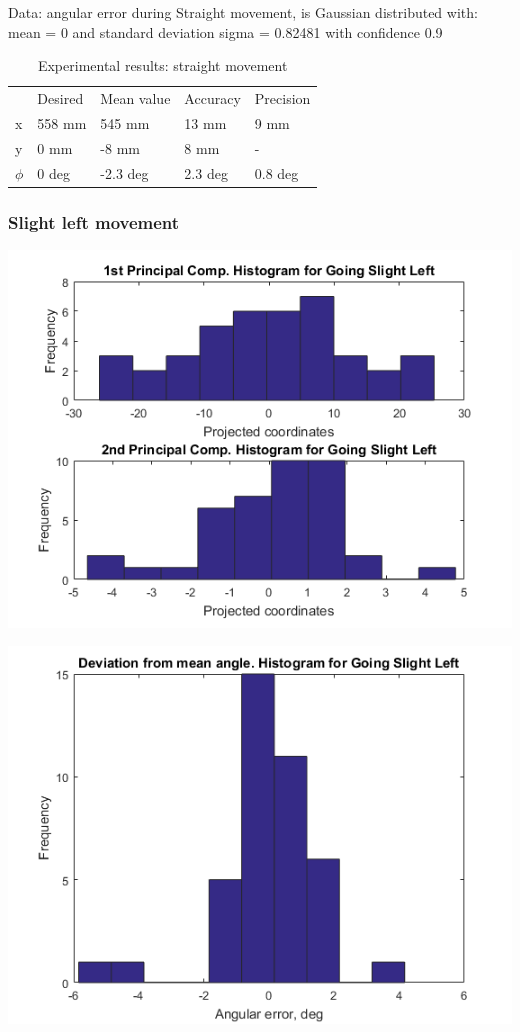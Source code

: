 \documentclass[a4paper, 12pt]{article}
\begin{document}
Data: angular error during   Straight movement, is Gaussian distributed with: mean = 0 and standard deviation sigma = 0.82481 with confidence 0.9%

\begin{table}[!h]
\centering
\caption{Experimental results: straight movement}
\begin{tabular}{lllll}
     & Desired & Mean value & Accuracy & Precision \\
x    &  558  mm     &    545  mm      &    13  mm    &     9  mm    \\
y    &  0  mm     &     -8  mm     &  8    mm    &    -       \\
$\phi$ &  0   deg    &     -2.3    deg   &     2.3 deg     & 0.8 deg
\end{tabular}
\end{table}


\newpage
\subsubsection{Slight left movement}

\begin{center}
  \includegraphics[scale=0.6]{l2}
  
  
  \includegraphics[scale=0.6]{l3}
\end{center}
\end{document}
